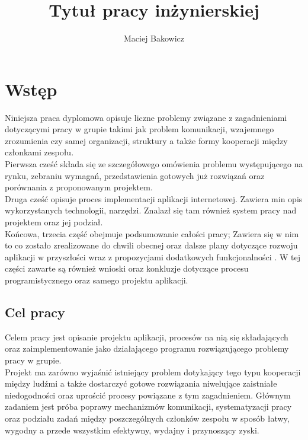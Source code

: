 \documentclass[eng,printmode]{mgr}
\title{Tytuł pracy inżynierskiej}
\author{Maciej Bakowicz}
\begin{document}


\maketitle 

\tableofcontents 

\chapter{Wstęp}  
Niniejsza praca dyplomowa opisuje liczne problemy związane z zagadnieniami dotyczącymi pracy w grupie takimi jak problem komunikacji, wzajemnego zrozumienia czy samej organizacji, struktury a także formy kooperacji między członkami zespołu.
\\
Pierwsza cześć składa się ze szczegółowego omówienia problemu występującego na rynku, zebraniu wymagań, przedstawienia gotowych już rozwiązań oraz porównania z proponowanym projektem.
\\
Druga cześć opisuje proces implementacji aplikacji internetowej. Zawiera min opis wykorzystanych technologii, narzędzi. Znalazł się tam również system pracy nad projektem oraz jej podział.
\\
Końcowa, trzecia część obejmuje podsumowanie całości pracy; Zawiera się w nim to co zostało zrealizowane do chwili obecnej oraz dalsze plany dotyczące rozwoju aplikacji w przyszłości wraz z propozycjami dodatkowych funkcjonalności . W tej części zawarte są również wnioski oraz konkluzje dotyczące procesu programistycznego oraz samego projektu aplikacji\cite{Node.js}.

\section{Cel pracy}
Celem pracy jest opisanie projektu aplikacji, procesów na nią się składających oraz zaimplementowanie jako działającego programu rozwiązującego problemy pracy w grupie.
\\
Projekt ma zarówno wyjaśnić istniejący problem dotykający tego typu kooperacji między ludźmi a także dostarczyć gotowe rozwiązania niwelujące zaistniałe niedogodności oraz uprościć procesy powiązane z tym zagadnieniem. Głównym zadaniem jest próba poprawy mechanizmów komunikacji, systematyzacji pracy oraz podziału zadań między poszczególnych członków zespołu w sposób łatwy, wygodny a przede wszystkim efektywny, wydajny i przynoszący zyski.
\end{document}
